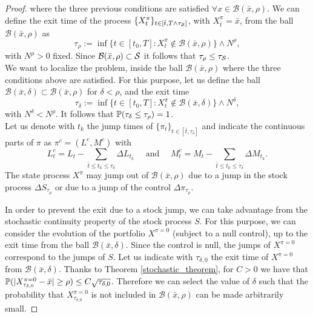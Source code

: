 \begin{proof}
where the three previous conditions are satisfied $\forall x \in \mathcal{B}(\bar x, \rho)$. 
We can define the exit time of the process $\{X^{\pi}_t\}_{t \in [\bar t, T\wedge \tau_{\mathcal{S}}]}$, with $X^{\pi}_{\bar t} = \bar x$, from the ball $\mathcal{B}(\bar x, \rho)$ as
\begin{equation}
 \tau_{\rho} := \inf \{ t \in [t_0,T] : X^{\pi}_t \not \in \mathcal{B}(\bar x, \rho) \} \wedge N^{\rho},
\end{equation}
with $N^{\rho}>0$ fixed.
Since $\mathcal{B}(\bar x, \rho) \subset \mathcal{S}$ it follows that $\tau_{\rho} \leq \tau_{\mathcal{S}}$.\\
We want to localize the problem, inside the ball $\mathcal{B}(\bar x, \rho) $ where the three conditions above are satisfied.
For this purpose, let us define the ball $\mathcal{B}(\bar x, \delta) \subset \mathcal{B}(\bar x, \rho) $ for $\delta < \rho$,
and the exit time
\begin{equation}
 \tau_{\delta} := \inf \{ t \in [t_0,T] : X^{\pi}_t \not \in \mathcal{B}(\bar x, \delta) \} \wedge N^{\delta},
\end{equation}
with $N^{\delta} < N^{\rho}$. It follows that $\mathbb{P}(\tau_{\delta} \leq \tau_{\rho}) = 1$. \\
Let us denote with $t_k$ the jump times of $\{\pi_t\}_{t \in [\bar t, \tau_{\delta}]}$ and indicate the continuous parts of $\pi$ as 
$\pi^c = (L^c, M^c)$ with
\begin{equation}
 L^c_t = L_t - \sum_{\bar t \leq t_k \leq \tau_{\delta}} \Delta L_{t_k} \quad \mbox{ and } \quad  M^c_t = M_t - \sum_{\bar t \leq t_k \leq \tau_{\delta}} \Delta M_{t_k}.
\end{equation}
The state process $X^{\pi}$ may jump out of $ \mathcal{B}(\bar x, \rho) $
due to a jump in the stock process $\Delta S_{\tau_{\rho}}$ or due to a jump of the control $\Delta \pi_{\tau_{\rho}}$.

In order to prevent the exit due to a stock jump, we can take advantage from the stochastic continuity property of the stock process $S$. 
For this purpose, we can 
consider the evolution of the portfolio $X^{\pi=0}$ (subject to a null control), up to the exit time from the ball $ \mathcal{B}(\bar x, \delta) $. 
Since the control is null, the jumps of $X^{\pi=0}$ correspond to the jumps of $S$.
Let us indicate with $\tau_{\delta,0}$ the exit time of $X^{\pi=0}$ from $ \mathcal{B}(\bar x, \delta) $.
Thanks to Theorem \ref{stochastic_theorem}, for $C>0$ we have that $\mathbb{P}( |X^{\pi=0}_{\tau_{\delta,0}} - \bar x| \geq \rho ) \leq C \sqrt{\tau_{\delta,0}}$. 
Therefore we can select the value of $\delta$ such that the probability that $X^{\pi=0}_{\tau_{\delta,0}}$ is not included in $ \mathcal{B}(\bar x, \rho) $ 
can be made arbitrarily small.


\end{proof}
